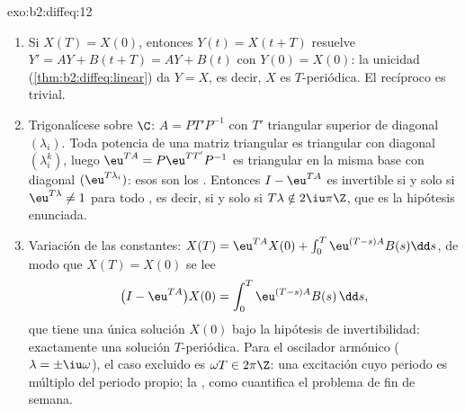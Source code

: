 \begin{solution}{exo:b2:diffeq:12}
\begin{enumerate}
  \item Si $X(T) = X(0)$, entonces $Y(t) = X(t + T)$ resuelve $Y' =
        AY + B(t + T) = AY + B(t)$ con $Y(0) = X(0)$: la unicidad
        (\cref{thm:b2:diffeq:linear}) da $Y = X$, es decir, $X$ es
        $T$-periódica. El recíproco es trivial.
  \item Trigonalícese sobre $\C$: $A = PT'P^{-1}$ con $T'$
        triangular superior de diagonal $(\lambda_i)$. Toda potencia
        de una matriz triangular es triangular con diagonal
        $(\lambda_i^k)$, luego $\eu^{TA} = P\eu^{TT'}P^{-1}$ es
        triangular en la misma base con diagonal
        $(\eu^{T\lambda_i})$: esos son los .
        Entonces $I - \eu^{TA}$ es invertible si y solo si
        $\eu^{T\lambda} \neq 1$ para todo , es decir, si
        y solo si $T\lambda \notin 2\iu\pi\Z$, que es la hipótesis
        enunciada.
  \item Variación de las constantes: $X(T) = \eu^{TA}X(0) +
        \int_0^T\eu^{(T-s)A}B(s)\dd s$, de modo que $X(T) = X(0)$ se
        lee
        \[
        \bigl(I - \eu^{TA}\bigr)X(0) =
        \int_0^{T}\eu^{(T-s)A}B(s)\,\dd s ,
        \]
        que tiene una única solución $X(0)$ bajo la hipótesis de
        invertibilidad: exactamente una solución $T$-periódica. Para
        el oscilador armónico ($\lambda = \pm\iu\omega$), el caso
        excluido es $\omega T \in 2\pi\Z$: una excitación cuyo
        periodo es múltiplo del periodo propio; la , como
        cuantifica el problema de fin de semana.
\end{enumerate}
\end{solution}


